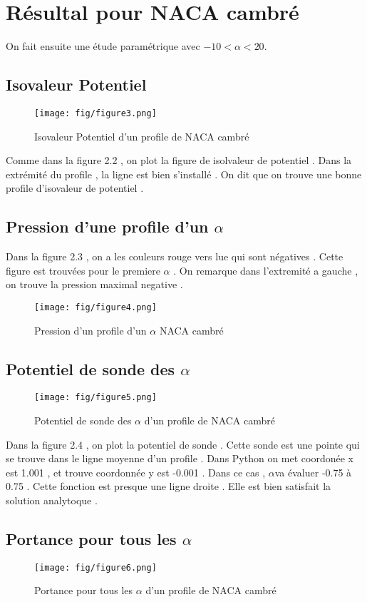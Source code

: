 \documentclass[a4paper,10pt]{report} %
\begin{document}
\section{Résultal pour NACA cambré}
On fait ensuite une étude paramétrique avec $-10<\alpha<20$.
\subsection{Isovaleur Potentiel}
\begin{figure}[h]
\centering
\texttt{[image: fig/figure3.png]}
\caption{	Isovaleur Potentiel d'un profile de NACA cambré}
\end{figure}

Comme dans la figure 2.2 , on plot la figure de isolvaleur de potentiel . Dans la extrémité du profile , la ligne est bien s'installé . On dit que on trouve une bonne profile d'isovaleur de potentiel .

\subsection{Pression d'une profile d'un $\alpha$}
Dans la figure 2.3 ,  on a les couleurs rouge vers lue qui sont négatives . Cette figure est trouvées pour le premiere $\alpha$ . On remarque dans l'extremité a gauche , on trouve la pression maximal negative .
\begin{figure}[h]
\centering
\texttt{[image: fig/figure4.png]}
\caption{Pression d'un profile d'un $\alpha$ NACA cambré}
\end{figure}


\subsection{Potentiel de sonde des $\alpha$}

\begin{figure}[h]
\centering
\texttt{[image: fig/figure5.png]}
\caption{	Potentiel de sonde des $\alpha$ d'un profile de NACA cambré}
\end{figure}

Dans la figure 2.4 , on plot la potentiel de sonde . Cette sonde est une pointe qui se trouve dans le ligne moyenne d'un profile . Dans Python on met coordonée x est 1.001 , et trouve coordonnée y est -0.001 . Dans ce cas , $\alpha$va évaluer -0.75 à 0.75 . Cette fonction est presque une ligne droite . Elle est bien satisfait la solution analytoque .
\subsection{Portance pour tous les $\alpha$}
\begin{figure}[h]
\centering
\texttt{[image: fig/figure6.png]}
\caption{	Portance pour tous les $\alpha$ d'un profile de NACA cambré}
\end{figure}
\end{document}
